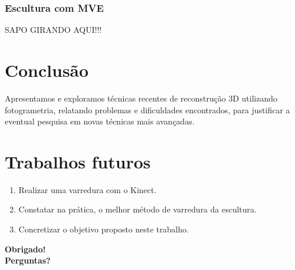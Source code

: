 \documentclass[table, usenames, svgnames, xcolor=dvipsnames]{beamer}
\begin{document}
\begin{frame}
\frametitle{\textbf{Escultura com MVE}}
	SAPO GIRANDO AQUI!!!
\end{frame}


\section{Conclusão}

\begin{frame}
	\begin{center}
	Apresentamos e exploramos técnicas recentes de reconstrução 3D utilizando fotogrametria, relatando problemas e dificuldades encontrados, para justificar a eventual pesquisa em novas técnicas mais avançadas.
	\end{center}
\end{frame}

\section{Trabalhos futuros}

\begin{frame}
	\begin{enumerate}
    	\item {Realizar uma varredura com o Kinect.}
		\item {Constatar na prática, o melhor método de varredura da escultura.} 
		\item {Concretizar o objetivo proposto neste trabalho.}
	\end{enumerate}
\end{frame}

\begin{frame}
	\begin{center}
	{\huge \bf Obrigado! \\
	Perguntas?}
\end{center}
	
\end{frame}
\end{document}
